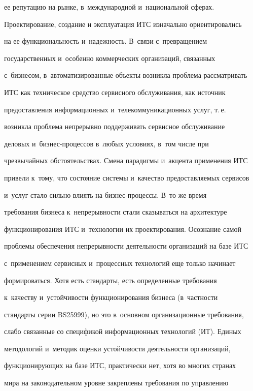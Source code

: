ее репутацию на рынке, в~международной и~национальной сферах.





  Проектирование, создание и эксплуатация ИТС изначально ориентировались


на ее функциональность и~надежность. В~связи с~превращением


государственных и~особенно коммерческих организаций, связанных


с~бизнесом, в~автоматизированные объекты возникла проблема рассматривать


ИТС как техническое средство сервисного обслуживания, как источник


предоставления информационных и~телекоммуникационных услуг, т.\,е.\


возникла проблема непрерывно поддерживать сервисное обслуживание


деловых и~биз\-нес-про\-цес\-сов в~любых условиях, в~том числе при


чрезвычайных обстоятельствах. Смена парадигмы и~акцента применения ИТС


привели к~тому, что состояние системы и~качество предоставляемых сервисов


и~услуг стало сильно влиять на биз\-нес-про\-цес\-сы. В~то же время


требования бизнеса к~непрерывности стали сказываться на архитектуре


функционирования ИТС и~технологии их проектирования. Осознание самой


проблемы обеспечения непрерывности деятельности организаций на базе ИТС


с~применением сервисных и~процессных технологий еще только начинает


формироваться. Хотя есть стандарты, есть определенные требования


к~качеству и~устойчивости функционирования бизнеса (в~част\-ности


стандарты серии BS25999), но это в~основном организационные требования,


слабо связанные со спецификой информационных технологий (ИТ). Единых


методологий и~методик оценки устойчивости деятельности организаций,


функционирующих на базе ИТС, практически нет, хотя во многих странах


мира на законодательном уровне закреплены требования по управ\-ле\-нию


